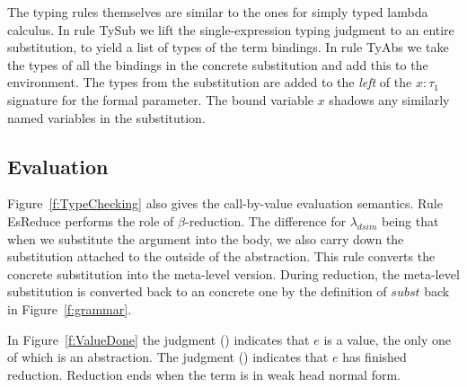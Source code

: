 The typing rules themselves are similar to the ones for simply typed lambda calculus. In rule TySub we lift the single-expression typing judgment to an entire substitution, to yield a list of types of the term bindings. In rule TyAbs we take the types of all the bindings in the concrete substitution and add this to the environment. The types from the substitution are added to the \emph{left} of the $x : \tau_1$ signature for the formal parameter. The bound variable $x$ shadows any similarly named variables in the substitution.


\subsection{Evaluation}
Figure~\ref{f:TypeChecking} also gives the call-by-value evaluation semantics. Rule EsReduce performs the role of $\beta$-reduction. The difference for $\lambda_{dsim}$ being that when we substitute the argument into the body, we also carry down the substitution attached to the outside of the abstraction. This rule converts the concrete substitution into the meta-level version. During reduction, the meta-level substitution is converted back to an concrete one by the definition of $subst$ back in Figure~\ref{f:grammar}.

In Figure~\ref{f:ValueDone} the judgment () indicates that $e$ is a value, the only one of which is an abstraction. The judgment \mbox{()} indicates that $e$ has finished reduction. Reduction ends when the term is in weak head normal form.

